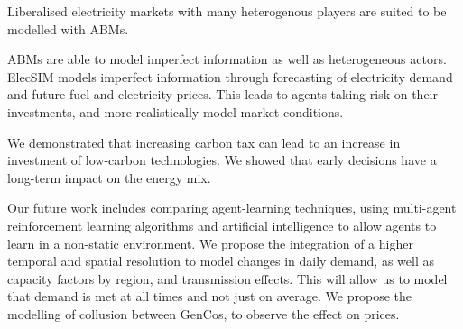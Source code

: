 

Liberalised electricity markets with many heterogenous players are suited to be modelled with ABMs.

ABMs are able to model imperfect information as well as heterogeneous actors. ElecSIM models imperfect information through forecasting of electricity demand and future fuel and electricity prices. This leads to agents taking risk on their investments, and more realistically model market conditions.

We demonstrated that increasing carbon tax can lead to an increase in investment of low-carbon technologies. We showed that early decisions have a long-term impact on the energy mix. 

Our future work includes comparing agent-learning techniques, using multi-agent reinforcement learning algorithms and artificial intelligence to allow agents to learn in a non-static environment. We propose the integration of a higher temporal and spatial resolution to model changes in daily demand, as well as capacity factors by region, and transmission effects. This will allow us to model that demand is met at all times and not just on average. We propose the modelling of collusion between GenCos, to observe the effect on prices.


\FloatBarrier